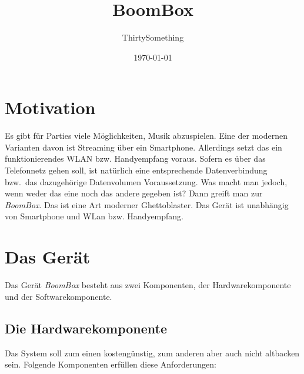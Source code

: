 \documentclass[12pt,a4paper]{article}
\author{ThirtySomething}
\title{BoomBox}
\date{\today}
\newcommand{\bb}{\textit{BoomBox}}
\begin{document}
\clearpage\maketitle
\thispagestyle{empty}
\newpage

\tableofcontents
{}
\newpage

\section{Motivation}
Es gibt für Parties viele Möglichkeiten, Musik abzuspielen. Eine der modernen Varianten davon ist Streaming über ein Smartphone. Allerdings setzt das
ein funktionierendes WLAN bzw. Handyempfang voraus. Sofern es über das Telefonnetz gehen soll, ist natürlich eine entsprechende Datenverbindung bzw.~das
dazugehörige Datenvolumen Voraussetzung. Was macht man jedoch, wenn weder das eine noch das andere gegeben ist? Dann greift man zur \bb{}.
Das ist eine Art moderner Ghettoblaster. Das Gerät ist unabhängig von Smartphone und WLan bzw. Handyempfang.

\newpage
\section{Das Gerät}
Das Gerät \bb{} besteht aus zwei Komponenten, der Hardwarekomponente und der Softwarekomponente.

\subsection{Die Hardwarekomponente}
Das System soll zum einen kostengünstig, zum anderen aber auch nicht altbacken sein. Folgende Komponenten erfüllen diese Anforderungen:
\end{document}
